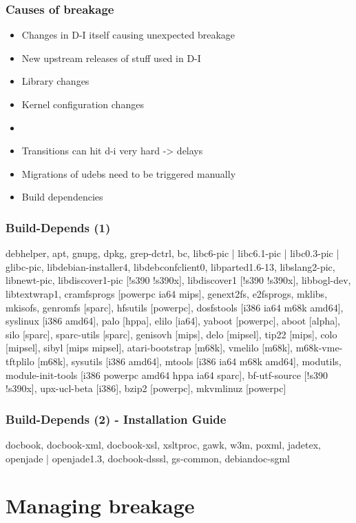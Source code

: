 \documentclass{beamer}
\begin{document}
\begin{frame}
  \frametitle{Causes of breakage}
	\begin{itemize}[<+->]
	\item
		Changes in D-I itself causing unexpected breakage
	\item
		New upstream releases of stuff used in D-I
	\item
		Library changes
	\item
		Kernel configuration changes
	\item
		
	\item
		Transitions can hit d-i very hard -> delays
	\item
		Migrations of udebs need to be triggered manually
	\item
		Build dependencies
	\end{itemize}
\end{frame}

\begin{frame}
  \frametitle{Build-Depends (1)}
debhelper, apt, gnupg, dpkg, grep-dctrl, bc, libc6-pic | libc6.1-pic | libc0.3-pic | glibc-pic, libdebian-installer4, libdebconfclient0, libparted1.6-13, libslang2-pic, libnewt-pic, libdiscover1-pic [!s390 !s390x], libdiscover1 [!s390 !s390x], libbogl-dev, libtextwrap1, cramfsprogs [powerpc ia64 mips], genext2fs, e2fsprogs, mklibs, mkisofs, genromfs [sparc], hfsutils [powerpc], dosfstools [i386 ia64 m68k amd64], syslinux [i386 amd64], palo [hppa], elilo [ia64], yaboot [powerpc], aboot [alpha], silo [sparc], sparc-utils [sparc], genisovh [mips], delo [mipsel], tip22 [mips], colo [mipsel], sibyl [mips mipsel], atari-bootstrap [m68k], vmelilo [m68k], m68k-vme-tftplilo [m68k], sysutils [i386 amd64], mtools [i386 ia64 m68k amd64], modutils, module-init-tools [i386 powerpc amd64 hppa ia64 sparc], bf-utf-source [!s390 !s390x], upx-ucl-beta [i386], bzip2 [powerpc], mkvmlinuz [powerpc]
\end{frame}

\begin{frame}
  \frametitle{Build-Depends (2) - Installation Guide}
docbook, docbook-xml, docbook-xsl, xsltproc, gawk, w3m, poxml, jadetex, openjade | openjade1.3, docbook-dsssl, gs-common, debiandoc-sgml
\end{frame}


\section{Managing breakage}
\end{document}
